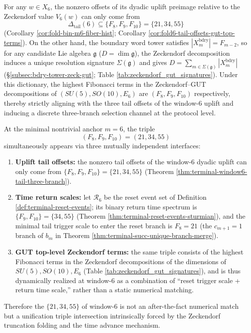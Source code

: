 \begin{enumerate}
  \begin{theorem}
  \label{thm:terminal-window6-tail-three-branch}
  For any \(w\in X_6\), the nonzero offsets of its dyadic uplift preimage relative to the Zeckendorf value \(V_6(w)\) can only come from
  \[
  \Delta_{\mathrm{tail}}(6)\subseteq\{F_8,F_9,F_{10}\}=\{21,34,55\}
  \]
  (Corollary \ref{cor:fold-bin-m6-fiber-hist}; Corollary \ref{cor:fold6-tail-offsets-gut-top-terms}).
  On the other hand, the boundary word tower satisfies \(|X_m^{\mathrm{bdry}}|=F_{m-2}\), so for any candidate Lie algebra \(\mathfrak g\) (\(D=\dim\mathfrak g\)), the Zeckendorf decomposition induces a unique resolution signature \(\Sigma(\mathfrak g)\) and gives
  \(D=\sum_{m\in\Sigma(\mathfrak g)}|X_m^{\mathrm{bdry}}|\) (\S\ref{subsec:bdry-tower-zeck-gut}; Table \ref{tab:zeckendorf_gut_signatures}).
  Under this dictionary, the highest Fibonacci terms in the Zeckendorf--GUT decompositions of \((SU(5),SO(10),E_6)\) are \((F_8,F_9,F_{10})\) respectively, thereby strictly aligning with the three tail offsets of the window-\(6\) uplift and inducing a discrete three-branch selection channel at the protocol level.
  \end{theorem}

  \begin{theorem}\label{thm:terminal-window6-unification-triple-dynamic}
  At the minimal nontrivial anchor \(m=6\), the triple
  \[
  (F_8,F_9,F_{10})=(21,34,55)
  \]
  simultaneously appears via three mutually independent interfaces:
  \begin{enumerate}
    \item \textbf{Uplift tail offsets:} the nonzero tail offsets of the window-\(6\) dyadic uplift can only come from \(\{F_8,F_9,F_{10}\}=\{21,34,55\}\) (Theorem \ref{thm:terminal-window6-tail-three-branch}).
    \item \textbf{Time return scales:} let \(\mathcal R_6\) be the reset event set of Definition \ref{def:terminal-reset-events}; its binary return time spectrum is \(\{F_9,F_{10}\}=\{34,55\}\) (Theorem \ref{thm:terminal-reset-events-sturmian}), and the minimal tail trigger scale to enter the reset branch is \(F_8=21\) (the \(c_{m+1}=1\) branch of \(b_m\) in Theorem \ref{thm:terminal-succ-unique-branch-merge}).
    \item \textbf{GUT top-level Zeckendorf terms:} the same triple consists of the highest Fibonacci terms in the Zeckendorf decompositions of the dimensions of \(SU(5),SO(10),E_6\) (Table \ref{tab:zeckendorf_gut_signatures}), and is thus dynamically realized at window-\(6\) as a combination of ``reset trigger scale + return time scale,'' rather than a static numerical matching.
  \end{enumerate}
  Therefore the \(\{21,34,55\}\) of window-\(6\) is not an after-the-fact numerical match but a unification triple intersection intrinsically forced by the Zeckendorf truncation folding and the time advance mechanism.
  \end{theorem}


\end{enumerate}
